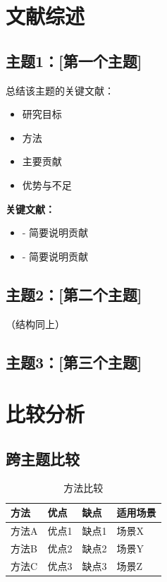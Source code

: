 \documentclass[11pt,a4paper]{article}
\begin{document}
\section{文献综述}
\label{sec:review}

\subsection{主题1：[第一个主题]}
总结该主题的关键文献：
\begin{itemize}
    \item 研究目标
    \item 方法
    \item 主要贡献
    \item 优势与不足
\end{itemize}

\textbf{关键文献：}
\begin{itemize}
    \item \cite{example2024} - 简要说明贡献
    \item \cite{sample2023} - 简要说明贡献
\end{itemize}

\subsection{主题2：[第二个主题]}
（结构同上）

\subsection{主题3：[第三个主题]}

\section{比较分析}
\label{sec:comparison}

\subsection{跨主题比较}
\begin{table}[htbp]
\centering
\caption{方法比较}
\label{tab:comparison}
\begin{tabular}{@{}llll@{}}
\toprule
方法 & 优点 & 缺点 & 适用场景 \\
\midrule
方法A & 优点1 & 缺点1 & 场景X \\
方法B & 优点2 & 缺点2 & 场景Y \\
方法C & 优点3 & 缺点3 & 场景Z \\
\bottomrule
\end{tabular}
\end{table}
\end{document}
